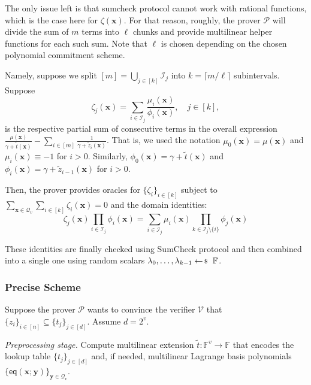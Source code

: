 \documentclass[../../book]{subfiles}
\begin{document}
The only issue left is that sumcheck protocol cannot work with rational
functions, which is the case here for $\zeta(\mathbf{x})$. For that reason,
roughly, the prover $\mathcal{P}$ will divide the sum of $m$ terms into $\ell$
chunks and provide multilinear helper functions for each such sum. Note that 
$\ell$ is chosen depending on the chosen polynomial commitment scheme. 

Namely, suppose we split $[m] = \bigcup_{j \in [k]}\mathcal{I}_j$ into $k=\lceil
m/\ell \rceil$ subintervals. Suppose 
\begin{equation*}
    \zeta_j(\mathbf{x}) = \sum_{i \in \mathcal{I}_j} \frac{\mu_i(\mathbf{x})}{\phi_i(\mathbf{x})}, \quad j \in [k],
\end{equation*}
is the respective partial sum of consecutive terms in the overall expression
$\frac{\mu(\mathbf{x})}{\gamma+\widetilde{t}(\mathbf{x})} - \sum_{i \in
[m]}\frac{1}{\gamma+\widetilde{z}_i(\mathbf{x})}$. That is, we used the notation
$\mu_0(\mathbf{x}) = \mu(\mathbf{x})$ and $\mu_i(\mathbf{x}) \equiv -1$ for
$i>0$. Similarly, $\phi_0(\mathbf{x}) = \gamma+\widetilde{t}(\mathbf{x})$ and
$\phi_i(\mathbf{x}) = \gamma +\widetilde{z}_{i-1}(\mathbf{x})$ for $i>0$.

Then, the prover provides oracles for $\{\zeta_i\}_{i \in [k]}$ subject to
$\sum_{\mathbf{x} \in \mathcal{Q}_v}\sum_{i \in [k]}\zeta_i(\mathbf{x}) = 0$
and the domain identities:
\begin{equation*}
    \zeta_j(\mathbf{x}) \prod_{i \in \mathcal{I}_j} \phi_i(\mathbf{x}) = \sum_{i \in \mathcal{I}_j}\mu_i(\mathbf{x})\prod_{k \in \mathcal{I}_j\setminus \{i\}} \phi_j(\mathbf{x})
\end{equation*}

These identities are finally checked using SumCheck protocol and then combined
into a single one using random scalars $\lambda_0,\dots,\lambda_{k-1}
\leftarrowS \mathbb{F}$.

\subsubsection{Precise Scheme}

Suppose the prover $\mathcal{P}$ wants to convince the verifier $\mathcal{V}$
that $\{z_i\}_{i \in [n]} \subseteq \{t_j\}_{j \in [d]}$. Assume $d=2^v$. 

\textit{Preprocessing stage.} Compute multilinear extension $\widetilde{t}:
\mathbb{F}^v \to \mathbb{F}$ that encodes the lookup table $\{t_j\}_{j \in [d]}$
and, if needed, multilinear Lagrange basis polynomials
$\{\mathsf{eq}(\mathbf{x};\mathbf{y})\}_{\mathbf{y} \in \mathcal{Q}_v}$.
\end{document}
